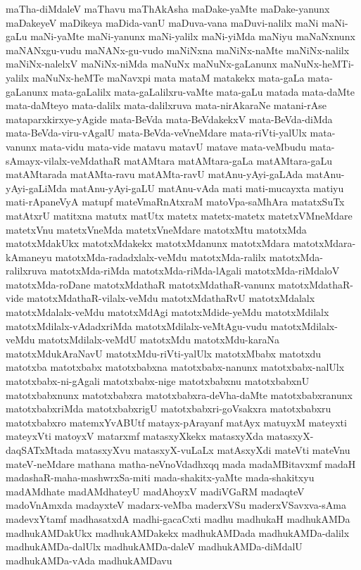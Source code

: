 {maTha-diMdaleV
maThavu
maThAkAsha
maDake-yaMte
maDake-yanunx
maDakeyeV
maDikeya
maDida-vanU
maDuva-vana
maDuvi-nalilx
maNi
maNi-gaLu
maNi-yaMte
maNi-yanunx
maNi-yalilx
maNi-yiMda
maNiyu
maNaNxnunx
maNANxgu-vudu
maNANx-gu-vudo
maNiNxna
maNiNx-naMte
maNiNx-nalilx
maNiNx-nalelxV
maNiNx-niMda
maNuNx
maNuNx-gaLanunx
maNuNx-heMTi-yalilx
maNuNx-heMTe
maNavxpi
mata
mataM
matakekx
mata-gaLa
mata-gaLanunx
mata-gaLalilx
mata-gaLalilxru-vaMte
mata-gaLu
matada
mata-daMte
mata-daMteyo
mata-dalilx
mata-dalilxruva
mata-nirAkaraNe
matani-rAse
mataparxkirxye-yAgide
mata-BeVda
mata-BeVdakekxV
mata-BeVda-diMda
mata-BeVda-viru-vAgalU
mata-BeVda-veVneMdare
mata-riVti-yalUlx
mata-vanunx
mata-vidu
mata-vide
matavu
matavU
matave
mata-veMbudu
mata-sAmayx-vilalx-veMdathaR
matAMtara
matAMtara-gaLa
matAMtara-gaLu
matAMtarada
matAMta-ravu
matAMta-ravU
matAnu-yAyi-gaLAda
matAnu-yAyi-gaLiMda
matAnu-yAyi-gaLU
matAnu-vAda
mati
mati-mucayxta
matiyu
mati-rApaneVyA
matupf
mateVmaRnAtxraM
matoVpa-saMhAra
matatxSuTx
matAtxrU
matitxna
matutx
matUtx
matetx
matetx-matetx
matetxVMneMdare
matetxVnu
matetxVneMda
matetxVneMdare
matotxMtu
matotxMda
matotxMdakUkx
matotxMdakekx
matotxMdanunx
matotxMdara
matotxMdara-kAmaneyu
matotxMda-radadxlalx-veMdu
matotxMda-ralilx
matotxMda-ralilxruva
matotxMda-riMda
matotxMda-riMda-lAgali
matotxMda-riMdaloV
matotxMda-roDane
matotxMdathaR
matotxMdathaR-vanunx
matotxMdathaR-vide
matotxMdathaR-vilalx-veMdu
matotxMdathaRvU
matotxMdalalx
matotxMdalalx-veMdu
matotxMdAgi
matotxMdide-yeMdu
matotxMdilalx
matotxMdilalx-vAdadxriMda
matotxMdilalx-veMtAgu-vudu
matotxMdilalx-veMdu
matotxMdilalx-veMdU
matotxMdu
matotxMdu-karaNa
matotxMdukAraNavU
matotxMdu-riVti-yalUlx
matotxMbabx
matotxdu
matotxba
matotxbabx
matotxbabxna
matotxbabx-nanunx
matotxbabx-nalUlx
matotxbabx-ni-gAgali
matotxbabx-nige
matotxbabxnu
matotxbabxnU
matotxbabxnunx
matotxbabxra
matotxbabxra-deVha-daMte
matotxbabxranunx
matotxbabxriMda
matotxbabxrigU
matotxbabxri-goVsakxra
matotxbabxru
matotxbabxro
matemxYvABUtf
matayx-pArayanf
matAyx
matuyxM
mateyxti
mateyxVti
matoyxV
matarxmf
matasxyXkekx
matasxyXda
matasxyX-daqSATxMtada
matasxyXvu
matasxyX-vuLaLx
matAsxyXdi
mateVti
mateVnu
mateV-neMdare
mathana
matha-neVnoVdadhxqq
mada
madaMBitavxmf
madaH
madashaR-maha-mashwrxSa-miti
mada-shakitx-yaMte
mada-shakitxyu
madAMdhate
madAMdhateyU
madAhoyxV
madiVGaRM
madaqteV
madoVnAmxda
madayxteV
madarx-veMba
maderxVSu
maderxVSavxva-sAma
madevxYtamf
madhasatxdA
madhi-gacaCxti
madhu
madhukaH
madhukAMDa
madhukAMDakUkx
madhukAMDakekx
madhukAMDada
madhukAMDa-dalilx
madhukAMDa-dalUlx
madhukAMDa-daleV
madhukAMDa-diMdalU
madhukAMDa-vAda
madhukAMDavu
}
